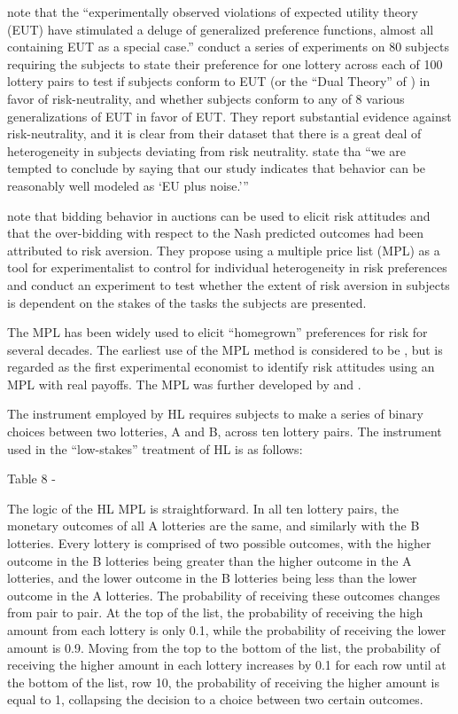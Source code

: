 \textcite[1291]{Hey1994} note that the \enquote{experimentally observed violations of expected utility theory (EUT) have stimulated a deluge of generalized preference functions, almost all containing  EUT as a special case.}
\textcite{Hey1994} conduct a series of experiments on 80 subjects requiring the subjects to state their preference for one lottery across each of 100 lottery pairs to test if subjects conform to EUT (or the \enquote{Dual Theory} of \textcite{Yaari1987}) in favor of risk-neutrality, and whether subjects conform to any of 8 various generalizations of EUT in favor of EUT.
They report substantial evidence against risk-neutrality, and it is clear from their dataset that there is a great deal of heterogeneity in subjects deviating from risk neutrality.
\textcite[1322]{Hey1994} state tha \enquote{we are tempted to conclude by saying that our study indicates that behavior can be reasonably well modeled \textelp{} as \enquote{EU plus noise.}} 

\textcite[1644]{Holt2002} note that bidding behavior in auctions can be used to elicit risk attitudes and that the over-bidding with respect to the Nash predicted outcomes had been attributed to risk aversion.
They propose using a multiple price list (MPL) as a tool for experimentalist to control for individual heterogeneity in risk preferences and conduct an experiment to test whether the extent of risk aversion in subjects is dependent on the stakes of the tasks the subjects are presented.

 
The MPL has been widely used to elicit \enquote{homegrown} preferences for risk for several decades.
The earliest use of the MPL method is considered to be \textcite{Miller1969}, but \textcite{Binswanger1980, Binswanger1981} is regarded as the first experimental economist to identify risk attitudes using an MPL with real payoffs.
The MPL was further developed by \textcite{Schubert1999} and \textcite{Holt2002}.

The instrument employed by HL requires subjects to make a series of binary choices between two lotteries, A and B, across ten lottery pairs.
The instrument used in the \enquote{low-stakes} treatment of HL is as follows:



Table 8 - \textcite{Holt2002}


The logic of the HL MPL is straightforward.
In all ten lottery pairs, the monetary outcomes of  all A lotteries are the same, and similarly with the B lotteries.
Every lottery is comprised of two possible outcomes, with the higher outcome in the B lotteries being greater than the higher outcome in the A lotteries, and the lower outcome in the B lotteries being less than the lower outcome in the A lotteries.
The probability of receiving these outcomes changes from pair to pair.
At the top of the list, the probability of receiving the high amount from each lottery is only 0.1, while the probability of receiving the lower amount is 0.9.
Moving from the top to the bottom of the list, the probability of receiving the higher amount in each lottery increases by 0.1 for each row until at the bottom of the list, row 10, the probability of receiving the higher amount is equal to 1, collapsing the decision to a choice between two certain outcomes.


